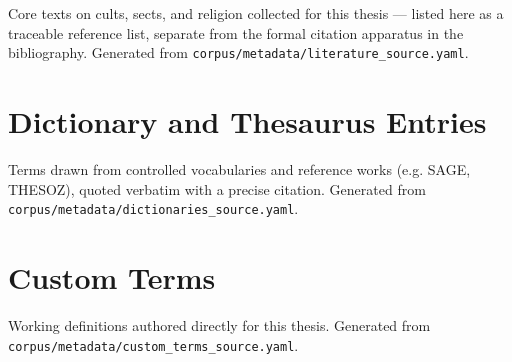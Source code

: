 Core texts on cults, sects, and religion collected for this thesis — listed
here as a traceable reference list, separate from the formal citation apparatus
in the bibliography. Generated from \texttt{corpus/metadata/literature\_source.yaml}.



\section{Dictionary and Thesaurus Entries}

Terms drawn from controlled vocabularies and reference works (e.g. SAGE,
THESOZ), quoted verbatim with a precise citation. Generated from
\texttt{corpus/metadata/dictionaries\_source.yaml}.



\section{Custom Terms}

Working definitions authored directly for this thesis. Generated from
\texttt{corpus/metadata/custom\_terms\_source.yaml}.



